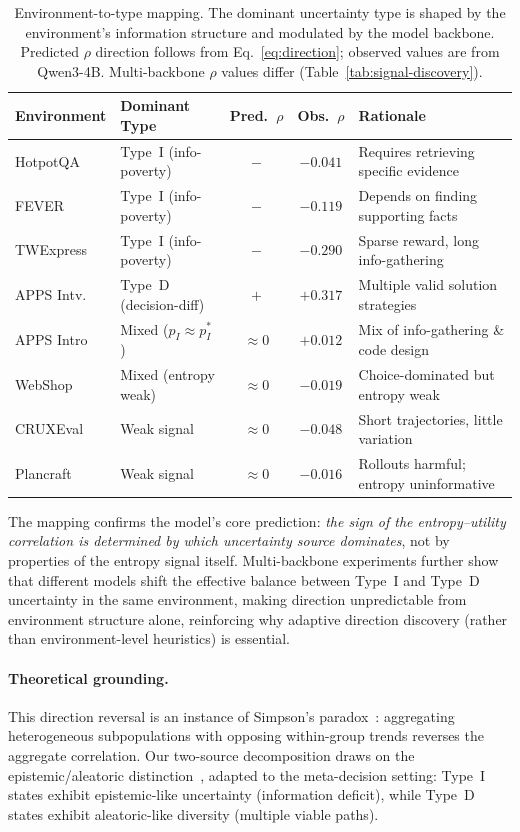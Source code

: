 \begin{table}[t]
\caption{Environment-to-type mapping. The dominant uncertainty
type is shaped by the environment's information structure and
modulated by the model backbone. Predicted $\rho$ direction
follows from Eq.~\eqref{eq:direction}; observed values are from
Qwen3-4B. Multi-backbone $\rho$ values differ
(Table~\ref{tab:signal-discovery}).}
\label{tab:env-type-mapping}
\centering\small
\begin{tabular}{llccl}
\toprule
Environment & Dominant Type & Pred.\ $\rho$ & Obs.\ $\rho$ & Rationale \\
\midrule
HotpotQA       & Type~I (info-poverty) & $-$ & $-0.041$ & Requires retrieving specific evidence \\
FEVER          & Type~I (info-poverty) & $-$ & $-0.119$ & Depends on finding supporting facts \\
TWExpress      & Type~I (info-poverty) & $-$ & $-0.290$ & Sparse reward, long info-gathering \\
\midrule
APPS Intv.     & Type~D (decision-diff) & $+$ & $+0.317$ & Multiple valid solution strategies \\
\midrule
APPS Intro     & Mixed ($p_I \approx p_I^*$) & $\approx 0$ & $+0.012$ & Mix of info-gathering \& code design \\
WebShop        & Mixed (entropy weak) & $\approx 0$ & $-0.019$ & Choice-dominated but entropy weak \\
\midrule
CRUXEval       & Weak signal & $\approx 0$ & $-0.048$ & Short trajectories, little variation \\
Plancraft      & Weak signal & $\approx 0$ & $-0.016$ & Rollouts harmful; entropy uninformative \\
\bottomrule
\end{tabular}
\end{table}

The mapping confirms the model's core prediction: \emph{the sign of
the entropy--utility correlation is determined by which uncertainty
source dominates}, not by properties of the entropy signal itself.
Multi-backbone experiments further show that different models shift
the effective balance between Type~I and Type~D uncertainty in the
same environment, making direction unpredictable from environment
structure alone, reinforcing why adaptive direction discovery
(rather than environment-level heuristics) is essential.

\paragraph{Theoretical grounding.}
This direction reversal is an instance of Simpson's
paradox~\citep{simpson1951interpretation, pearl2014understanding}:
aggregating heterogeneous subpopulations with opposing within-group
trends reverses the aggregate correlation. Our two-source
decomposition draws on the epistemic/aleatoric
distinction~\citep{hullermeier2021aleatoric, der2009aleatory},
adapted to the meta-decision setting: Type~I states exhibit
epistemic-like uncertainty (information deficit), while Type~D states
exhibit aleatoric-like diversity (multiple viable paths).

